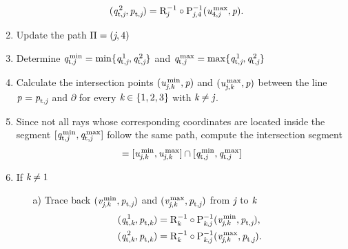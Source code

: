 \begin{enumerate}
\begin{equation*}
\begin{aligned}
(\textit{q}_{\textrm{t,} \textit{\textit{j}}}^{\,2}, \textit{p}_{\textrm{t,} \textit{\textit{j}}}) & =\mathrm{R}_{{\textit{j}}}^{-1}\circ \mathrm{P}_{{\textit{j},4}}^{-1}(\textit{u}_{4,\textit{j}}^\textrm{\,max}, \textit{p}).
\end{aligned}
\end{equation*}
\item Update the path $\Pi = (\textit{j}, 4)$
\item Determine $\textit{q}_{\textrm{t,} \textit{\textit{j}}}^\textrm{\,min}= \min\{\textit{q}_{\textrm{t,} \textit{\textit{j}}}^{\,1}, \textit{q}_{\textrm{t,} \textit{\textit{j}}}^{\,2}\}$ and $\textit{q}_{\textrm{t,} \textit{\textit{j}}}^\textrm{\,max}= \max\{\textit{q}_{\textrm{t,} \textit{\textit{j}}}^{\,1}, \textit{q}_{\textrm{t,} \textit{\textit{j}}}^{\,2}\}$
\item Calculate the intersection points $(\textit{u}_{\textit{j},\textit{k}}^\textrm{\,min}, \textit{p})$ and $(\textit{u}_{\textit{j},\textit{k}}^\textrm{\,max}, \textit{p})$ between the line $\textit{p}_{\textrm{} \textit{}}=\textit{p}_{\textrm{t,} \textit{\textit{j}}}$ and 
$\partial$ for every $\textit{k}\in\{1,2,3\}$ with $\textit{k}\neq\textit{j}$.
\item Since not all rays whose corresponding coordinates are located inside the segment
$[\textit{q}_{\textrm{t,} \textit{\textit{j}}}^\textrm{\,min}, \textit{q}_{\textrm{t,} \textit{\textit{j}}}^\textrm{\,max}]$ follow the same path,
 compute the intersection segment 
\begin{equation*}
[\variabile{v}_{\lineai, \lineaj}^\textrm{\,min}, \variabile{v}_{\lineai, \lineaj}^\textrm{\,max}] = [\variabile{u}_{\lineai, \lineaj}^\textrm{\,min}, \variabile{u}_{\lineai, \lineaj}^\textrm{\,max}]\cap
 [\pos{t,}{\lineai}^\textrm{\,min}, \pos{t,}{\lineai}^\textrm{\,max}]
\end{equation*}
\item If $\textit{k}\neq 1$ 
\begin{itemize}
\item[a)] Trace back $(\textit{v}_{\textit{j}, \textit{k}}^\textrm{\,min}, \textit{p}_{\textrm{t,} \textit{\textit{j}}})$ and $(\textit{v}_{\textit{j}, \textit{k}}^\textrm{\,max}, \textit{p}_{\textrm{t,} \textit{\textit{j}}})$ from $\textit{j}$ to $\textit{k}$ 
\begin{equation*}
\begin{aligned}
(\textit{q}_{\textrm{t,} \textit{\textit{k}}}^{\,1}, \textit{p}_{\textrm{t,} \textit{\textit{k}}})& =\mathrm{R}_{{\textit{k}}}^{-1}\circ \mathrm{P}_{{\textit{k},\textit{j}}}^{-1}(\textit{v}_{\textit{j}, \textit{k}}^\textrm{\,min}, \textit{p}_{\textrm{t,} \textit{\textit{j}}}),  \\
(\textit{q}_{\textrm{t,} \textit{\textit{k}}}^{\,2}, \textit{p}_{\textrm{t,} \textit{\textit{k}}}) & =\mathrm{R}_{{\textit{k}}}^{-1}\circ \mathrm{P}_{{\textit{k},\textit{j}}}^{-1}(\textit{v}_{\textit{j}, \textit{k}}^\textrm{\,max}, \textit{p}_{\textrm{t,} \textit{\textit{j}}}).
\end{aligned}
\end{equation*}

\end{itemize}
\end{enumerate}
